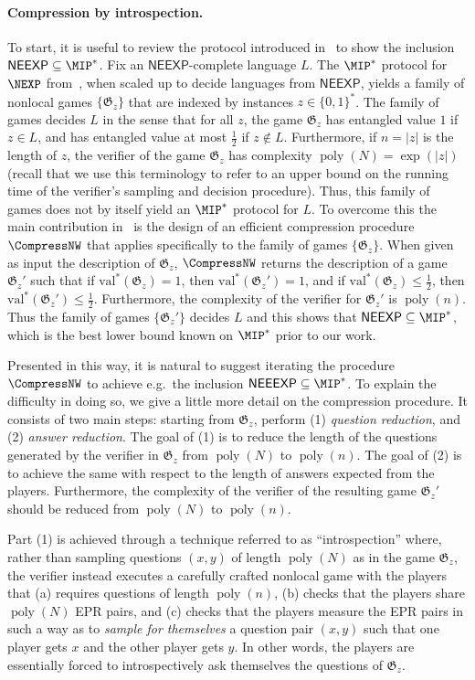 \documentclass[11pt]{article}
\theoremstyle{definition}
\DeclareMathOperator{\poly}{poly}
\newcommand{\val}{\ensuremath{\mathrm{val}}}
\newcommand{\game}{\mathfrak{G}}
\newcommand{\class}[1]{\ensuremath{\mathsf{#1}}\xspace}
\newcommand{\NEEXP}{\class{NEEXP}} \newcommand{\NEEEXP}{\class{NEEEXP}}
\begin{document}
\paragraph{Compression by introspection.}
To start, it is useful to review the protocol introduced in~\cite{NW19} to show
the inclusion $\NEEXP \subseteq \MIP^*$.
Fix an $\NEEXP$-complete language $L$.
The $\MIP^*$ protocol for $\NEXP$ from~\cite{natarajan2018two}, when scaled up
to decide languages from $\NEEXP$, yields a family of nonlocal games $\{ \game_z
\}$ that are indexed by instances $z \in \{0,1\}^*$.
The family of games decides $L$ in the sense that for all $z$, the game
$\game_z$ has entangled value $1$ if $z \in L$, and has entangled value at most
$\frac{1}{2}$ if $z \notin L$.
Furthermore, if $n = |z|$ is the length of $z$, the verifier of the game
$\game_z$ has complexity $\poly(N)=\exp(|z|)$ (recall that we use this
terminology to refer to an upper bound on the running time of the verifier's
sampling and decision procedure).
Thus, this family of games does not by itself yield an $\MIP^*$ protocol for
$L$.
To overcome this the main contribution in~\cite{NW19} is the design of an
efficient compression procedure $\CompressNW$ that applies specifically to the
family of games $\{\game_z \}$.
When given as input the description of $\game_z$, $\CompressNW$ returns the
description of a game $\game_z'$ such that if $\val^*(\game_z) = 1$, then
$\val^*(\game_z') = 1$, and if $\val^*(\game_z) \leq \frac{1}{2}$, then
$\val^*(\game_z') \leq \frac{1}{2}$.
Furthermore, the complexity of the verifier for $\game_z'$ is $\poly(n)$.
Thus the family of games $\{ \game_z' \}$ decides $L$ and this shows that
$\NEEXP \subseteq \MIP^*$, which is the best lower bound known on $\MIP^*$
prior to our work.
  

Presented in this way, it is natural to suggest iterating the procedure $\CompressNW$ to achieve e.g.\ the inclusion $\NEEEXP \subseteq \MIP^*$. To explain the difficulty in doing so, we give a little more detail on the compression procedure. It consists of two main steps: starting from $\game_z$, perform (1) \emph{question reduction}, and (2) \emph{answer reduction}. The goal of (1) is to reduce the length of the questions generated by the verifier in $\game_z$ from $\poly(N)$ to $\poly(n)$. The goal of (2) is to achieve the same with respect to the length of answers expected from the players. Furthermore, the complexity of the verifier of the resulting game $\game_z'$ should be reduced from $\poly(N)$ to  $\poly(n)$.
	
	Part (1) is achieved through a technique referred to as ``introspection'' where, rather than sampling questions $(x,y)$ of length $\poly(N)$ as in the game $\game_z$, the verifier instead executes a carefully crafted nonlocal game with the players that (a) requires questions of length $\poly(n)$, (b) checks that the players share $\poly(N)$ EPR pairs, and (c) checks that the players measure the EPR pairs in such a way as to \emph{sample for themselves} a question pair $(x,y)$ such that one player gets $x$ and the other player gets $y$. In other words, the players are essentially forced to introspectively ask themselves the questions of $\game_z$. 
	
\end{document}
